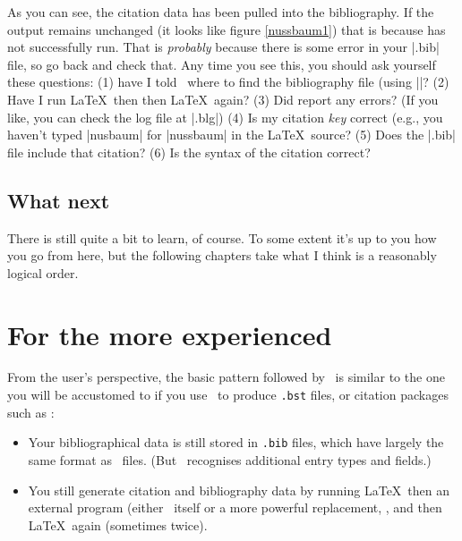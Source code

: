 As you can see, the citation data has been pulled into the
bibliography. If the output remains unchanged (it looks like figure
\ref{nussbaum1}) that is because  has not successfully
run. That is \emph{probably} because there is some error in your
|.bib| file, so go back and check that. Any time you see this, you
should ask yourself these
questions: (1) have I told \biblatex\ where
to find the bibliography file (using ||? (2) Have I
run \LaTeX\ then  then \LaTeX\ again? (3) Did
 report any errors? (If you like, you can check the log file at
|.blg|) (4) Is my citation \emph{key} correct (e.g.,
you haven't typed |nusbaum| for |nussbaum| in the \LaTeX\ source? (5)
Does the |.bib| file include that citation? (6) Is the syntax of the
citation correct?

\subsection{What next}

There is still quite a bit to learn, of course. To some extent it's up
to you how you go from here, but the following chapters take what I
think is a reasonably logical order.

\section{For the more experienced}
\label{expert}

From the user's perspective, the basic pattern followed by \biblatex\
is similar to the one you will be accustomed to if you use \bibtex\
to produce \verb|.bst| files, or citation packages such as :
\begin{itemize}
\item Your bibliographical data is still stored in \verb|.bib| files,
  which have largely the same format as \bibtex\ files. (But
  \biblatex\ recognises additional entry types and fields.)
\item You still generate citation and bibliography data by running
  \LaTeX\, then an external program (either \bibtex\ itself or a more
  powerful replacement, \package{Biber}, and then \LaTeX\ again
  (sometimes twice).
\end{itemize}

